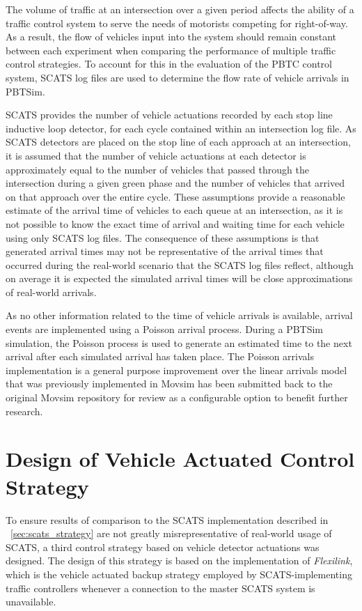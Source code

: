 The volume of traffic at an intersection over a given period affects the ability of a traffic control system to serve the needs of motorists competing for right-of-way. As a result, the flow of vehicles input into the system should remain constant between each experiment when comparing the performance of multiple traffic control strategies. To account for this in the evaluation of the PBTC control system, SCATS log files are used to determine the flow rate of vehicle arrivals in PBTSim. 

SCATS provides the number of vehicle actuations recorded by each stop line inductive loop detector, for each cycle contained within an intersection log file. As SCATS detectors are placed on the stop line of each approach at an intersection, it is assumed that the number of vehicle actuations at each detector is approximately equal to the number of vehicles that passed through the intersection during a given green phase and the number of vehicles that arrived on that approach over the entire cycle. These assumptions provide a reasonable estimate of the arrival time of vehicles to each queue at an intersection, as it is not possible to know the exact time of arrival and waiting time for each vehicle using only SCATS log files. The consequence of these assumptions is that generated arrival times may not be representative of the arrival times that occurred during the real-world scenario that the SCATS log files reflect, although on average it is expected the simulated arrival times will be close approximations of real-world arrivals. 

As no other information related to the time of vehicle arrivals is available, arrival events are implemented using a Poisson arrival process. During a PBTSim simulation, the Poisson process is used to generate an estimated time to the next arrival after each simulated arrival has taken place. The Poisson arrivals implementation is a general purpose improvement over the linear arrivals model that was previously implemented in Movsim has been submitted back to the original Movsim repository for review as a configurable option to benefit further research.

\section{Design of Vehicle Actuated Control Strategy}

To ensure results of comparison to the SCATS implementation described in ~\ref{sec:scats_strategy} are not greatly misrepresentative of real-world usage of SCATS, a third control strategy based on vehicle detector actuations was designed. The design of this strategy is based on the implementation of \emph{Flexilink}, which is the vehicle actuated backup strategy employed by SCATS-implementing traffic controllers whenever a connection to the master SCATS system is unavailable. %


